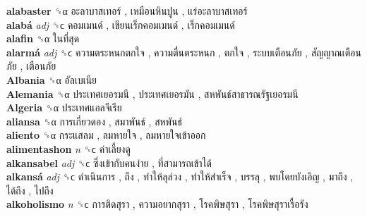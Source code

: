 \textbf{alabaster} ␝α   อะลาบาสเทอร์ ,  เหมือนหินปูน ,  แร่อะลาบาสเทอร์   \\
\textbf{alabá} \emph{adj}  ␝ϲ   คอมเมนด์ ,  เขียนเร็กคอมเมนด์ ,  เร็กคอมเมนด์   \\
\textbf{alafin} ␝α   ในที่สุด   \\
\textbf{alarmá} \emph{adj}  ␝ϲ   ความตระหนกตกใจ ,  ความตื่นตระหนก ,  ตกใจ ,  ระบบเตือนภัย ,  สัญญาณเตือนภัย ,  เตือนภัย   \\
\textbf{Albania} ␝α   อัลเบเนีย   \\
\textbf{Alemania} ␝α   ประเทศเยอรมนี ,  ประเทศเยอรมัน ,  สหพันธ์สาธารณรัฐเยอรมนี   \\
\textbf{Algeria} ␝α   ประเทศแอลจีเรีย   \\
\textbf{aliansa} ␝α   การเกี่ยวดอง ,  สมาพันธ์ ,  สหพันธ์   \\
\textbf{aliento} ␝α   กระแสลม ,  ลมหายใจ ,  ลมหายใจเข้าออก   \\
\textbf{alimentashon} \emph{n}  ␝ϲ   ค่าเลี้ยงดู   \\
\textbf{alkansabel} \emph{adj}  ␝ϲ   ซึ่งเข้ากับคนง่าย ,  ที่สามารถเข้าได้   \\
\textbf{alkansá} \emph{adj}  ␝ϲ   ดำเนินการ ,  ถึง ,  ทำให้ลุล่วง ,  ทำให้สำเร็จ ,  บรรลุ ,  พบโดยบังเอิญ ,  มาถึง ,  ได้ถึง ,  ไปถึง   \\
\textbf{alkoholismo} \emph{n}  ␝ϲ   การติดสุรา ,  ความอยากสุรา ,  โรคพิษสุรา ,  โรคพิษสุราเรื้อรัง   \\
